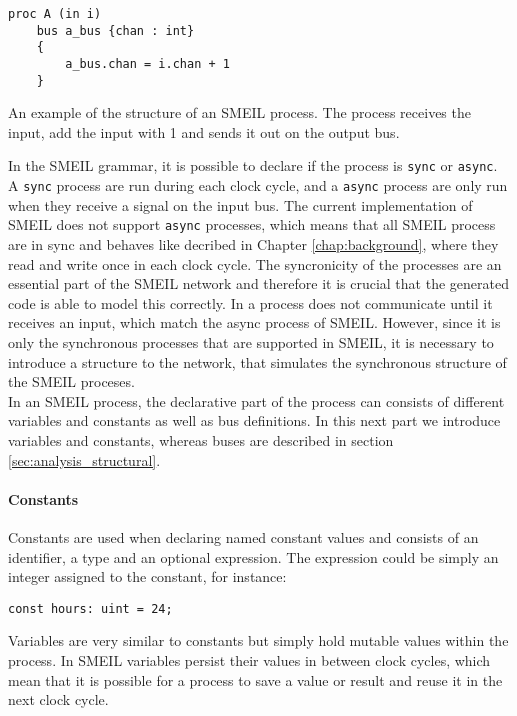 \begin{listing}
\begin{verbatim}
proc A (in i)
    bus a_bus {chan : int}
    {
        a_bus.chan = i.chan + 1
    }
\end{verbatim}
\caption{An example of the structure of an SMEIL process. The process receives the input, add the input with 1 and sends it out on the output bus.}
\label{fig:small_proc_example_smeil}
\end{listing}

In the SMEIL grammar, it is possible to declare if the process is \texttt{sync} or \texttt{async}. A \texttt{sync} process are run during each clock cycle, and a \texttt{async} process are only run when they receive a signal on the input bus. The current implementation of SMEIL does not support \texttt{async} processes, which means that all SMEIL process are in sync and behaves like decribed in Chapter \ref{chap:background}, where they read and write once in each clock cycle.
The syncronicity of the processes are an essential part of the SMEIL network and therefore it is crucial that the generated code is able to model this correctly. In \cspm{} a process does not communicate until it receives an input, which match the async process of SMEIL. However, since it is only the  synchronous processes that are supported in SMEIL, it is necessary to introduce
a structure to the \cspm network, that simulates the synchronous structure of the SMEIL proceses.
\\

In an SMEIL process, the declarative part of the process can consists of different variables and constants as well as bus definitions. In this next part we introduce variables and constants, whereas buses are described in section \ref{sec:analysis_structural}.
\paragraph{Constants}
Constants are used when declaring named constant values and consists of an identifier, a type and an optional expression. The expression could be simply an integer assigned to the constant, for instance:
\begin{verbatim}
const hours: uint = 24;
\end{verbatim}
Variables are very similar to constants but simply hold mutable values within the process. In SMEIL variables persist their values in between clock cycles, which mean that it is possible for a process to save a value or result and reuse it in the next clock cycle.
